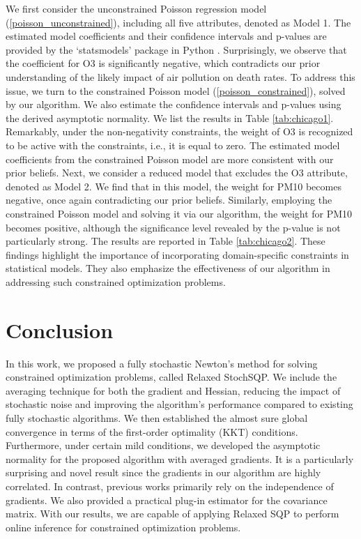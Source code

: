 \documentclass[aos]{imsart}
\numberwithin{equation}{section}
\theoremstyle{plain}
\begin{document}
We first consider the unconstrained Poisson regression model (\ref{poisson_unconstrained}), including all five attributes, denoted as Model 1. The estimated model coefficients and their confidence intervals and p-values are provided by the `statsmodels' package in Python \cite{seabold2010statsmodels}. Surprisingly, we observe that the coefficient for O3 is significantly negative, which contradicts our prior understanding of the likely impact of air pollution on death rates. To address this issue, we turn to the constrained Poisson model (\ref{poisson_constrained}), solved by our algorithm. We also estimate the confidence intervals and p-values using the derived asymptotic normality. We list the results in Table \ref{tab:chicago1}. Remarkably, under the non-negativity constraints, the weight of O3 is recognized to be active with the constraints, i.e., it is equal to zero. The estimated model coefficients from the constrained Poisson model are more consistent with our prior beliefs. Next, we consider a reduced model that excludes the O3 attribute, denoted as Model 2. We find that in this model, the weight for PM10 becomes negative, once again contradicting our prior beliefs.
Similarly, employing the constrained Poisson model and solving it via our algorithm, the weight for PM10 becomes positive, although the significance level revealed by the p-value is not particularly strong. The results are reported in Table \ref{tab:chicago2}. 
These findings highlight the importance of incorporating domain-specific constraints in statistical models. They also emphasize the effectiveness of our algorithm in addressing such constrained optimization problems.


\section{Conclusion}
In this work, we proposed a fully stochastic Newton's method for solving constrained optimization problems, called Relaxed StochSQP. We include the averaging technique for both the gradient and Hessian, reducing the impact of stochastic noise and improving the algorithm's performance compared to existing fully stochastic algorithms. We then established the almost sure global convergence in terms of the first-order optimality (KKT) conditions. Furthermore, under certain mild conditions, we developed the asymptotic normality for the proposed algorithm with averaged gradients. It is a particularly surprising and novel result since the gradients in our algorithm are highly correlated. In contrast, previous works primarily rely on the independence of gradients. We also provided a practical plug-in estimator for the covariance matrix. With our results, we are capable of applying Relaxed SQP to perform online inference for constrained optimization problems. 
\end{document}
